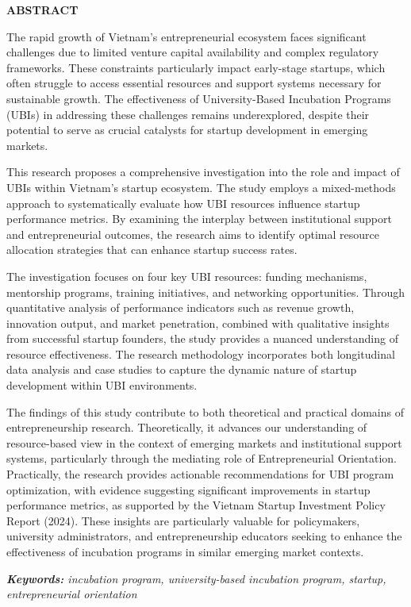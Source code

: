\documentclass[../Main.tex]{subfiles}
\begin{document}
	\begin{center}
		\Large{\textbf{ABSTRACT}}\\
	\end{center}
	\vspace{1cm}
	The rapid growth of Vietnam's entrepreneurial ecosystem faces significant challenges due to limited venture capital availability and complex regulatory frameworks. These constraints particularly impact early-stage startups, which often struggle to access essential resources and support systems necessary for sustainable growth. The effectiveness of University-Based Incubation Programs (UBIs) in addressing these challenges remains underexplored, despite their potential to serve as crucial catalysts for startup development in emerging markets.

	This research proposes a comprehensive investigation into the role and impact of UBIs within Vietnam's startup ecosystem. The study employs a mixed-methods approach to systematically evaluate how UBI resources influence startup performance metrics. By examining the interplay between institutional support and entrepreneurial outcomes, the research aims to identify optimal resource allocation strategies that can enhance startup success rates.

	The investigation focuses on four key UBI resources: funding mechanisms, mentorship programs, training initiatives, and networking opportunities. Through quantitative analysis of performance indicators such as revenue growth, innovation output, and market penetration, combined with qualitative insights from successful startup founders, the study provides a nuanced understanding of resource effectiveness. The research methodology incorporates both longitudinal data analysis and case studies to capture the dynamic nature of startup development within UBI environments.

	The findings of this study contribute to both theoretical and practical domains of entrepreneurship research. Theoretically, it advances our understanding of resource-based view in the context of emerging markets and institutional support systems, particularly through the mediating role of Entrepreneurial Orientation. Practically, the research provides actionable recommendations for UBI program optimization, with evidence suggesting significant improvements in startup performance metrics, as supported by the Vietnam Startup Investment Policy Report (2024). These insights are particularly valuable for policymakers, university administrators, and entrepreneurship educators seeking to enhance the effectiveness of incubation programs in similar emerging market contexts.

	\emph{\textbf{Keywords:} incubation program, university-based incubation program, startup, entrepreneurial orientation}
\end{document}
